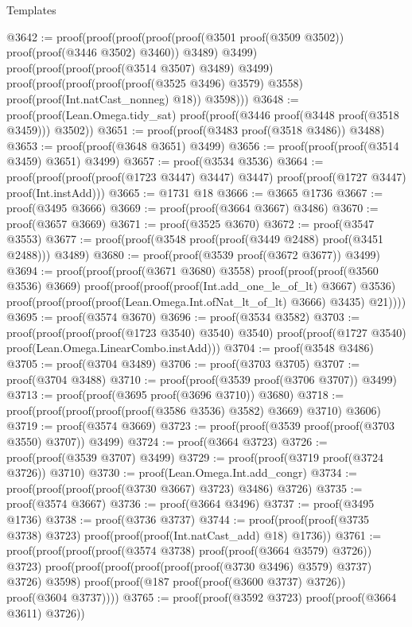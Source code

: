 \begin{lexlean}{Templates}
\begin{coremodule}
@3642 := proof(proof(proof(proof(proof(@3501 proof(@3509 @3502)) proof(proof(@3446 @3502) @3460))
          @3489)
        @3499)
      proof(proof(proof(proof(@3514 @3507) @3489) @3499)
          proof(proof(proof(proof(proof(@3525 @3496) @3579) @3558)
                proof(proof(Int.natCast_nonneg) @18))
              @3598)))
@3648 := proof(proof(Lean.Omega.tidy_sat) proof(proof(@3446 proof(@3448 proof(@3518 @3459))) @3502))
@3651 := proof(proof(@3483 proof(@3518 @3486)) @3488)
@3653 := proof(proof(@3648 @3651) @3499)
@3656 := proof(proof(proof(@3514 @3459) @3651) @3499)
@3657 := proof(@3534 @3536)
@3664 := proof(proof(proof(proof(@1723 @3447) @3447) @3447)
      proof(proof(@1727 @3447) proof(Int.instAdd)))
@3665 := @1731 @18
@3666 := @3665 @1736
@3667 := proof(@3495 @3666)
@3669 := proof(proof(@3664 @3667) @3486)
@3670 := proof(@3657 @3669)
@3671 := proof(@3525 @3670)
@3672 := proof(@3547 @3553)
@3677 := proof(proof(@3548 proof(proof(@3449 @2488) proof(@3451 @2488))) @3489)
@3680 := proof(proof(@3539 proof(@3672 @3677)) @3499)
@3694 := proof(proof(proof(@3671 @3680) @3558)
      proof(proof(proof(@3560 @3536) @3669)
          proof(proof(proof(proof(Int.add_one_le_of_lt) @3667) @3536)
              proof(proof(proof(proof(Lean.Omega.Int.ofNat_lt_of_lt) @3666) @3435) @21))))
@3695 := proof(@3574 @3670)
@3696 := proof(@3534 @3582)
@3703 := proof(proof(proof(proof(@1723 @3540) @3540) @3540)
      proof(proof(@1727 @3540) proof(Lean.Omega.LinearCombo.instAdd)))
@3704 := proof(@3548 @3486)
@3705 := proof(@3704 @3489)
@3706 := proof(@3703 @3705)
@3707 := proof(@3704 @3488)
@3710 := proof(proof(@3539 proof(@3706 @3707)) @3499)
@3713 := proof(proof(@3695 proof(@3696 @3710)) @3680)
@3718 := proof(proof(proof(proof(proof(@3586 @3536) @3582) @3669) @3710) @3606)
@3719 := proof(@3574 @3669)
@3723 := proof(proof(@3539 proof(proof(@3703 @3550) @3707)) @3499)
@3724 := proof(@3664 @3723)
@3726 := proof(proof(@3539 @3707) @3499)
@3729 := proof(proof(@3719 proof(@3724 @3726)) @3710)
@3730 := proof(Lean.Omega.Int.add_congr)
@3734 := proof(proof(proof(proof(@3730 @3667) @3723) @3486) @3726)
@3735 := proof(@3574 @3667)
@3736 := proof(@3664 @3496)
@3737 := proof(@3495 @1736)
@3738 := proof(@3736 @3737)
@3744 := proof(proof(proof(@3735 @3738) @3723) proof(proof(proof(Int.natCast_add) @18) @1736))
@3761 := proof(proof(proof(proof(@3574 @3738) proof(proof(@3664 @3579) @3726)) @3723)
      proof(proof(proof(proof(proof(proof(@3730 @3496) @3579) @3737) @3726) @3598)
          proof(proof(@187 proof(proof(@3600 @3737) @3726)) proof(@3604 @3737))))
@3765 := proof(proof(@3592 @3723) proof(proof(@3664 @3611) @3726))

\end{coremodule}
\end{lexlean}
